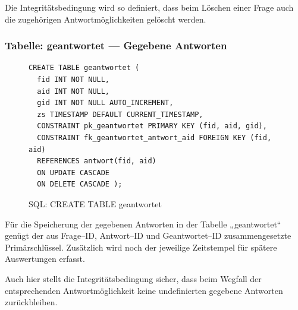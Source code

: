 Die Integritätsbedingung wird so definiert, dass beim Löschen einer Frage auch die zugehörigen Antwortmöglichkeiten gelöscht werden.

\subsubsection{Tabelle: geantwortet --- Gegebene Antworten}
\begin{figure}[H]
\begin{verbatim}
CREATE TABLE geantwortet (
  fid INT NOT NULL,
  aid INT NOT NULL,
  gid INT NOT NULL AUTO_INCREMENT,
  zs TIMESTAMP DEFAULT CURRENT_TIMESTAMP,
  CONSTRAINT pk_geantwortet PRIMARY KEY (fid, aid, gid),
  CONSTRAINT fk_geantwortet_antwort_aid FOREIGN KEY (fid, aid) 
  REFERENCES antwort(fid, aid) 
  ON UPDATE CASCADE 
  ON DELETE CASCADE );
\end{verbatim}
\caption{SQL: CREATE TABLE geantwortet}
\label{sql:tblgeantwortet}
\end{figure}

Für die Speicherung der gegebenen Antworten in der Tabelle „geantwortet“ genügt der aus Frage--ID, Antwort--ID und Geantwortet--ID zusammengesetzte Primärschlüssel. Zusätzlich wird noch der jeweilige Zeitstempel für spätere Auswertungen erfasst.

Auch hier stellt die Integritätsbedingung sicher, dass beim Wegfall der entsprechenden Antwortmöglichkeit keine undefinierten gegebene Antworten zurückbleiben.
